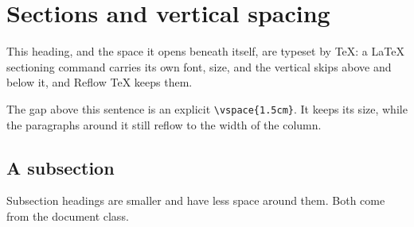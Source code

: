 \section*{Sections and vertical spacing}
This heading, and the space it opens beneath itself, are typeset by \TeX{}: a
\LaTeX{} sectioning command carries its own font, size, and the vertical skips
above and below it, and Reflow TeX keeps them.

\vspace{1.5cm}

The gap above this sentence is an explicit \verb|\vspace{1.5cm}|. It keeps its
size, while the paragraphs around it still reflow to the width of the column.

\subsection*{A subsection}
Subsection headings are smaller and have less space around them. Both come
from the document class.
